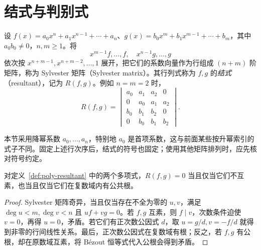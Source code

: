\section{结式与判别式}
\label{sec:poly-resultant}

\begin{definition}
\label{def:poly-resultant}
设 $f(x)=a_0x^n+a_1x^{n-1}+\cdots+a_n$、$g(x)=b_0x^m+b_1x^{m-1}+\cdots+b_m$，其中 $a_0b_0\ne0$，$n,m\geq1$。将
\[
    x^{m-1}f,\ldots,f,\quad x^{n-1}g,\ldots,g
\]
依次按 $x^{n+m-1},x^{n+m-2},\ldots,1$ 展开，把它们的系数向量作为行组成 $(n+m)$ 阶矩阵，称为 Sylvester 矩阵（Sylvester matrix）。其行列式称为 $f,g$ 的\emph{结式}（resultant），记为 $R(f,g)$。例如 $n=m=2$ 时，
\[
    R(f,g)=\begin{vmatrix}
    a_0&a_1&a_2&0\\0&a_0&a_1&a_2\\
    b_0&b_1&b_2&0\\0&b_0&b_1&b_2
    \end{vmatrix}.
\]
\end{definition}

本节采用降幂系数 $a_0,\ldots,a_n$，特别地 $a_0$ 是首项系数，这与前面某些按升幂索引的式子不同。固定上述行次序后，结式的符号也固定；使用其他矩阵排列时，应先核对符号约定。

\begin{theorem}
\label{thm:poly-resultant-criterion}
对定义~\ref{def:poly-resultant} 中的两个多项式，$R(f,g)=0$ 当且仅当它们不互素，也当且仅当它们在复数域内有公共根。
\end{theorem}
\begin{proof}
Sylvester 矩阵奇异，当且仅当存在不全为零的 $u,v$，满足 $\deg u<m,\deg v<n$ 且 $uf+vg=0$。若 $f,g$ 互素，则 $f\mid v$，次数条件迫使 $v=0$，再得 $u=0$，矛盾。若它们有正次数公因式 $d$，取 $u=g/d,v=-f/d$ 就得到非零的行间线性关系。最后，正次数公因式在复数域有根；反之，若 $f,g$ 有公根，却在原数域互素，将 Bézout 恒等式代入公根会得到矛盾。
\end{proof}

